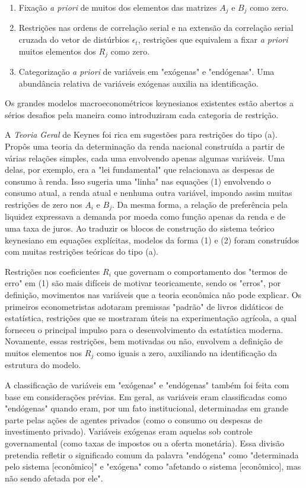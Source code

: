 \documentclass[12pt]{article}
\begin{document}
\begin{enumerate}
    \item[(a)] Fixação \textit{a priori} de muitos dos elementos das matrizes $A_j$ e $B_j$ como zero.
    \item[(b)] Restrições nas ordens de correlação serial e na extensão da correlação serial cruzada do vetor de distúrbios $\epsilon_t$, restrições que equivalem a fixar \textit{a priori} muitos elementos dos $R_j$ como zero.
    \item[(c)] Categorização \textit{a priori} de variáveis em "exógenas" e "endógenas". Uma abundância relativa de variáveis exógenas auxilia na identificação.
\end{enumerate}

Os grandes modelos macroeconométricos keynesianos existentes estão abertos a sérios desafios pela maneira como introduziram cada categoria de restrição.

A \textit{Teoria Geral} de Keynes foi rica em sugestões para restrições do tipo (a). Propôs uma teoria da determinação da renda nacional construída a partir de várias relações simples, cada uma envolvendo apenas algumas variáveis. Uma delas, por exemplo, era a "lei fundamental" que relacionava as despesas de consumo à renda. Isso sugeria uma "linha" nas equações (1) envolvendo o consumo atual, a renda atual e nenhuma outra variável, impondo assim muitas restrições de zero nos $A_i$ e $B_j$. Da mesma forma, a relação de preferência pela liquidez expressava a demanda por moeda como função apenas da renda e de uma taxa de juros. Ao traduzir os blocos de construção do sistema teórico keynesiano em equações explícitas, modelos da forma (1) e (2) foram construídos com muitas restrições teóricas do tipo (a).

Restrições nos coeficientes $R_i$ que governam o comportamento dos "termos de erro" em (1) são mais difíceis de motivar teoricamente, sendo os "erros", por definição, movimentos nas variáveis que a teoria econômica não pode explicar. Os primeiros econometristas adotaram premissas "padrão" de livros didáticos de estatística, restrições que se mostraram úteis na experimentação agrícola, a qual forneceu o principal impulso para o desenvolvimento da estatística moderna. Novamente, essas restrições, bem motivadas ou não, envolvem a definição de muitos elementos nos $R_j$ como iguais a zero, auxiliando na identificação da estrutura do modelo.

A classificação de variáveis em "exógenas" e "endógenas" também foi feita com base em considerações prévias. Em geral, as variáveis eram classificadas como "endógenas" quando eram, por um fato institucional, determinadas em grande parte pelas ações de agentes privados (como o consumo ou despesas de investimento privado). Variáveis exógenas eram aquelas sob controle governamental (como taxas de impostos ou a oferta monetária). Essa divisão pretendia refletir o significado comum da palavra "endógena" como "determinada pelo sistema [econômico]" e "exógena" como "afetando o sistema [econômico], mas não sendo afetada por ele".
\end{document}
